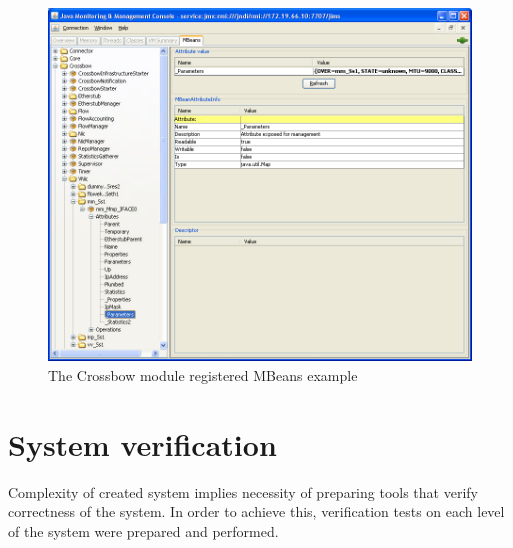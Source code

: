 \documentclass[11pt,openany]{book}
\begin{document}
        \begin{figure}[H]
          \centering
          \includegraphics[width=1.0\textwidth]{img/impl/jconsole.png}

          \caption{The Crossbow module registered MBeans example}
          \label{fig:impl:xbow-jconsole}
        \end{figure}




		

    \section{System verification}
    \label{sec:impl:verif}
  
      Complexity of created system implies necessity of preparing tools that verify correctness of the system. In order
      to achieve this, verification tests on each level of the system were prepared and performed.
\end{document}
